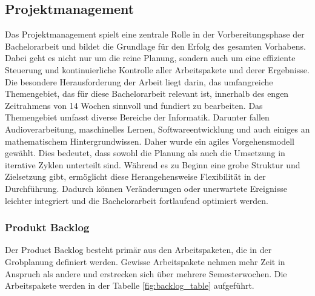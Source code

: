 \documentclass[main.tex]{subfiles} %
\begin{document}
\subsection{Projektmanagement}
Das Projektmanagement spielt eine zentrale Rolle in der Vorbereitungsphase der Bachelorarbeit 
und bildet die Grundlage für den Erfolg des gesamten Vorhabens. Dabei geht es nicht nur um die 
reine Planung, sondern auch um eine effiziente Steuerung und kontinuierliche Kontrolle aller 
Arbeitspakete und derer Ergebnisse. Die besondere Herausforderung der Arbeit liegt darin, 
das umfangreiche Themengebiet, das für diese Bachelorarbeit relevant ist, innerhalb des engen 
Zeitrahmens von 14 Wochen sinnvoll und fundiert zu bearbeiten. Das Themengebiet umfasst diverse 
Bereiche der Informatik. Darunter fallen Audioverarbeitung, maschinelles Lernen, 
Softwareentwicklung und auch einiges an mathematischem Hintergrundwissen. Daher wurde ein agiles 
Vorgehensmodell gewählt. Dies bedeutet, dass sowohl die Planung als auch die Umsetzung in iterative 
Zyklen unterteilt sind. Während es zu Beginn eine grobe Struktur und Zielsetzung gibt, ermöglicht 
diese Herangehensweise Flexibilität in der Durchführung. Dadurch können Veränderungen oder 
unerwartete Ereignisse leichter integriert und die Bachelorarbeit fortlaufend optimiert werden.

\newpage
\subsubsection{Produkt Backlog}

Der Product Backlog besteht primär aus den Arbeitspaketen, die in der Grobplanung definiert werden.
Gewisse Arbeitspakete nehmen mehr Zeit in Anspruch als andere und erstrecken sich über mehrere
Semesterwochen. Die Arbeitspakete werden in der Tabelle \ref{fig:backlog_table} aufgeführt.
\end{document}
